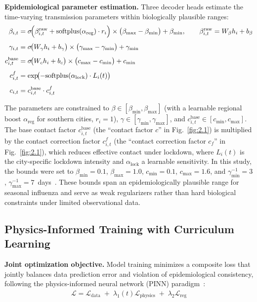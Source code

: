 \documentclass[10pt,letterpaper]{article}
\begin{document}
	\noindent\textbf{Epidemiological parameter estimation.}
	Three decoder heads estimate the time-varying transmission parameters within
	biologically plausible ranges:
	\begin{align*}
		\beta_{i,t}
		&= \sigma\!\Bigl( \beta_{i,t}^{\mathrm{raw}}
		+ \mathrm{softplus}(\alpha_{\mathrm{reg}}) \cdot r_i \Bigr)
		\times \bigl(\beta_{\max} - \beta_{\min}\bigr) + \beta_{\min},
		\qquad \beta_{i,t}^{\mathrm{raw}} = W_\beta h_i + b_\beta 
		\\[4pt]
		\gamma_{i,t}
		&= \sigma\!\bigl(W_\gamma h_i + b_\gamma\bigr)
		\times \bigl(\gamma_{\max} - \gamma_{\min}\bigr) + \gamma_{\min}
		\\[4pt]
		c_{i,t}^{\mathrm{base}}
		&= \sigma\!\bigl(W_c h_i + b_c\bigr)
		\times \bigl(c_{\max} - c_{\min}\bigr) + c_{\min}
		\\[4pt]
		c_{i,t}^{f}
		&= \exp\!\bigl(-\mathrm{softplus}(\alpha_{\mathrm{lock}}) \cdot L_i(t)\bigr)
		\\[4pt]
		c_{i,t}
		&= c_{i,t}^{\mathrm{base}} \cdot c_{i,t}^{f}
	\end{align*}
	
	\noindent The parameters are constrained to $\beta \in [\beta_{\min}, \beta_{\max}]$
	(with a learnable regional boost $\alpha_{\mathrm{reg}}$ for southern cities,
	$r_i = 1$), $\gamma \in [\gamma_{\min}, \gamma_{\max}]$, and
	$c_{i,t}^{\mathrm{base}} \in [c_{\min}, c_{\max}]$. The base contact factor
	$c_{i,t}^{\mathrm{base}}$ (the ``contact factor $c$'' in Fig.~\ref{fig:2.1}) is
	multiplied by the contact correction factor $c_{i,t}^{f}$ (the ``contact correction
	factor $c_f$'' in Fig.~\ref{fig:2.1}), which reduces effective contact under lockdown,
	where $L_i(t)$ is the city-specific lockdown intensity and $\alpha_{\mathrm{lock}}$ a
	learnable sensitivity. In this study, the bounds were set to
	$\beta_{\min} = 0.1$, $\beta_{\max} = 1.0$, $c_{\min} = 0.1$, $c_{\max} = 1.6$, and
	$\gamma^{-1}_{\min} = 3$, $\gamma^{-1}_{\max} = 7$~days~\cite{tang2020}. These bounds
	span an epidemiologically plausible range for seasonal influenza and serve as weak
	regularizers rather than hard biological constraints under limited observational data.
	
	\subsection*{Physics-Informed Training with Curriculum Learning}
	
	\noindent\textbf{Joint optimization objective.}
	Model training minimizes a composite loss that jointly balances
	data prediction error and violation of epidemiological consistency,
	following the physics-informed neural network (PINN) paradigm~\cite{raissi2019,he2023}:
	\begin{align}
		\mathcal{L}
		=
		\mathcal{L}_{\mathrm{data}}
		\;+\;
		\lambda_1(t) \mathcal{L}_{\mathrm{physics}}
		\;+\;
		\lambda_2 \mathcal{L}_{\mathrm{reg}}
		\label{eq:total_loss}
	\end{align}
	
\end{document}
